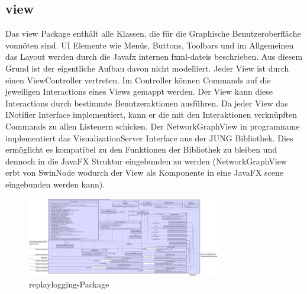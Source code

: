 \subsection{view}
\label{subsec:view}

Das view Package enthält alle Klassen, die für die Graphische Benutzeroberfläche vonnöten sind. UI Elemente wie Menüs, Buttons, Toolbars und im Allgemeinen das Layout werden durch die Javafx internen \glspl{fxml-datei} beschrieben. Aus diesem Grund ist der eigentliche Aufbau davon nicht modelliert.
Jeder View ist durch einen ViewController vertreten. Im Controller können Commands auf die jeweiligen Interactions eines Views gemappt werden. Der View kann diese Interactions durch bestimmte Benutzeraktionen ausführen. Da jeder View das INotifier Interface implementiert, kann er die mit den Interaktionen verknüpften Commands zu allen Listenern schicken.
Der NetworkGraphView in \gls{programname} implementiert das VisualizationServer Interface aus der JUNG Bibliothek. Dies ermöglicht es kompatibel zu den Funktionen der Bibliothek zu bleiben und dennoch in die JavaFX Struktur eingebunden zu werden (NetworkGraphView erbt von SwinNode wodurch der View als Komponente in eine JavaFX scene eingebunden werden kann).

\clearpage
\begin{figure}
  \centering
  \includegraphics[width=\textwidth]{../diagramimages/view.png}
  \caption{replaylogging-Package}
\end{figure}
\clearpage
